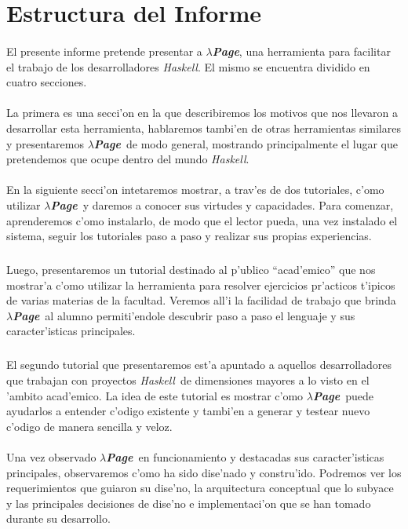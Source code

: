 \documentclass[a4paper]{article}
\newcommand{\haskell}{\textsl{Haskell}}
\newcommand{\hpage}{\textbf{\textsl{$\lambda$Page}}}
\begin{document}
\tableofcontents

\newpage
\section{Estructura del Informe}
\paragraph{}El presente informe pretende presentar a \hpage, una herramienta para facilitar el trabajo de los desarrolladores \haskell.  El mismo se encuentra dividido en cuatro secciones.
\paragraph{}La primera es una secci'on en la que describiremos los motivos que nos llevaron a desarrollar esta herramienta, hablaremos tambi'en de otras herramientas similares y presentaremos \hpage\ de modo general, mostrando principalmente el lugar que pretendemos que ocupe dentro del mundo \haskell.
\paragraph{}En la siguiente secci'on intetaremos mostrar, a trav'es de dos tutoriales, c'omo utilizar \hpage\ y daremos a conocer sus virtudes y capacidades.  Para comenzar, aprenderemos c'omo instalarlo, de modo que el lector pueda, una vez instalado el sistema, seguir los tutoriales paso a paso y realizar sus propias experiencias.
\subparagraph{}Luego, presentaremos un tutorial destinado al p'ublico ``acad'emico'' que nos mostrar'a c'omo utilizar la herramienta para resolver ejercicios pr'acticos t'ipicos de varias materias de la facultad.  Veremos all'i la facilidad de trabajo que brinda \hpage\ al alumno permiti'endole descubrir paso a paso el lenguaje y sus caracter'isticas principales.
\subparagraph{}El segundo tutorial que presentaremos est'a apuntado a aquellos desarrolladores que trabajan con proyectos \haskell\ de dimensiones mayores a lo visto en el 'ambito acad'emico.  La idea de este tutorial es mostrar c'omo \hpage\ puede ayudarlos a entender c'odigo existente y tambi'en a generar y testear nuevo c'odigo de manera sencilla y veloz.
\paragraph{}Una vez observado \hpage\ en funcionamiento y destacadas sus caracter'isticas principales, observaremos c'omo ha sido dise'nado y constru'ido.  Podremos ver los requerimientos que guiaron su dise'no, la arquitectura conceptual que lo subyace y las principales decisiones de dise'no e implementaci'on que se han tomado durante su desarrollo.
\end{document}
